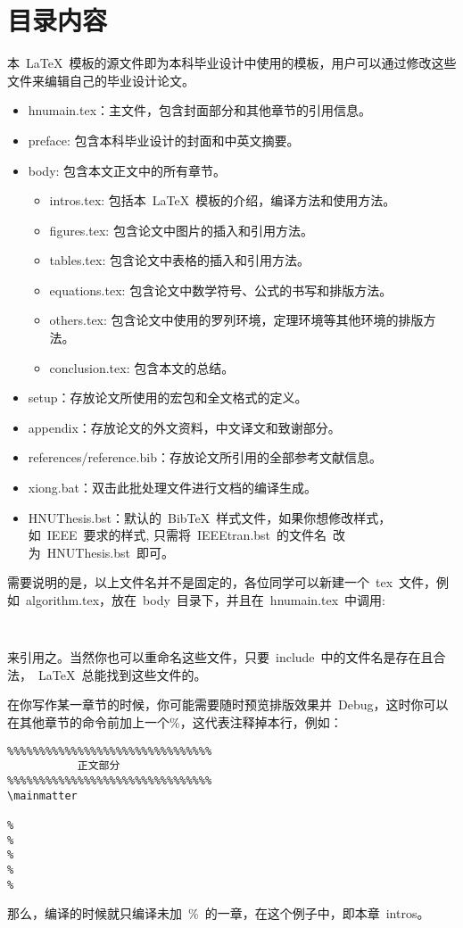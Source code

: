 \section{目录内容}
本~\LaTeX{}~模板的源文件即为本科毕业设计中使用的模板，用户可以通过修改这些文件来编辑自己的毕业设计论文。
\begin{itemize}
\item{hnumain.tex}：主文件，包含封面部分和其他章节的引用信息。
\item{preface}: 包含本科毕业设计的封面和中英文摘要。
\item{body}: 包含本文正文中的所有章节。
\begin{itemize}
\item{intros.tex}: 包括本~\LaTeX{}~模板的介绍，编译方法和使用方法。
\item{figures.tex}: 包含论文中图片的插入和引用方法。
\item{tables.tex}: 包含论文中表格的插入和引用方法。
\item{equations.tex}: 包含论文中数学符号、公式的书写和排版方法。
\item{others.tex}: 包含论文中使用的罗列环境，定理环境等其他环境的排版方法。
\item{conclusion.tex}: 包含本文的总结。
\end{itemize}
\item{setup}：存放论文所使用的宏包和全文格式的定义。
\item{appendix}：存放论文的外文资料，中文译文和致谢部分。
\item{references/reference.bib}：存放论文所引用的全部参考文献信息。
\item{xiong.bat}：双击此批处理文件进行文档的编译生成。

\item{HNUThesis.bst}：默认的~BibTeX~样式文件，如果你想修改样式，如~IEEE~要求的样式, 只需将~IEEEtran.bst~的文件名~改为~HNUThesis.bst~即可。
\end{itemize}
需要说明的是，以上文件名并不是固定的，各位同学可以新建一个~tex~文件，例如~algorithm.tex，放在~body~目录下，并且在~hnumain.tex~中调用:
\begin{verbatim}
    
\end{verbatim}
来引用之。当然你也可以重命名这些文件，只要~include~中的文件名是存在且合法，~\LaTeX~总能找到这些文件的。

在你写作某一章节的时候，你可能需要随时预览排版效果并~Debug，这时你可以在其他章节的\verb||命令前加上一个\%，这代表注释掉本行，例如：
\begin{verbatim}
%%%%%%%%%%%%%%%%%%%%%%%%%%%%%%%%
           正文部分
%%%%%%%%%%%%%%%%%%%%%%%%%%%%%%%%
\mainmatter

%
%
%
%
%
\end{verbatim}
那么，编译的时候就只编译未加~\%~的一章，在这个例子中，即本章~intros。

